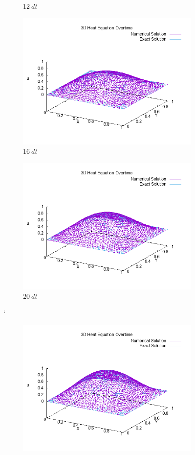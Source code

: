 \documentclass[a4paper,10pt]{article}
\begin{document}
\begin{figure}[h!]
\begin{subfigure}{.5\textwidth}
		\caption{$ 12 \ dt $}
		\label{}
	\end{subfigure}
	\begin{subfigure}{.5\textwidth}
		\centering
		\includegraphics[width=0.9\linewidth]{picture/heatplot_frame-016}
		\caption{$ 16 \ dt $}
		\label{}
	\end{subfigure}
	\begin{subfigure}{.5\textwidth}
		\centering
		\includegraphics[width=0.9\linewidth]{picture/heatplot_frame-020}
		\caption{$ 20 \ dt $}
		\label{}
	\end{subfigure}
`	\begin{subfigure}{.5\textwidth}
		\centering
		\includegraphics[width=0.9\linewidth]{picture/heatplot_frame-024}

\end{subfigure}
\end{figure}
\end{document}
